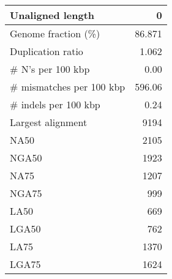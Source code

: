 \documentclass[12pt,a4paper]{article}
\begin{document}
\begin{table}[ht]
\begin{center}
\begin{tabular}{|l*{1}{|r}|}
Unaligned length & 0 \\ \hline
Genome fraction (\%) & 86.871 \\ \hline
Duplication ratio & 1.062 \\ \hline
\# N's per 100 kbp & 0.00 \\ \hline
\# mismatches per 100 kbp & 596.06 \\ \hline
\# indels per 100 kbp & 0.24 \\ \hline
Largest alignment & 9194 \\ \hline
NA50 & 2105 \\ \hline
NGA50 & 1923 \\ \hline
NA75 & 1207 \\ \hline
NGA75 & 999 \\ \hline
LA50 & 669 \\ \hline
LGA50 & 762 \\ \hline
LA75 & 1370 \\ \hline
LGA75 & 1624 \\ \hline
\end{tabular}
\end{center}
\end{table}
\end{document}
